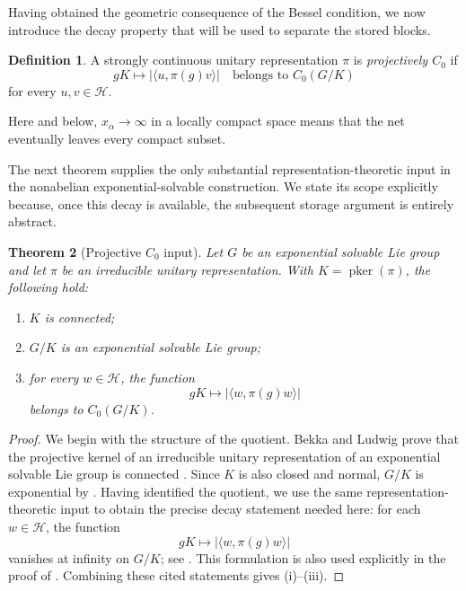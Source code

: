 \documentclass[reqno]{amsart}
\numberwithin{equation}{section}
\newtheorem{theorem}{Theorem}[section]
\theoremstyle{definition}
\newtheorem{definition}[theorem]{Definition}
\theoremstyle{remark}
\newcommand{\cH}{\mathcal H}
\newcommand{\pker}{\operatorname{pker}}
\begin{document}
Having obtained the geometric consequence of the Bessel condition, we now
introduce the decay property that will be used to separate the stored blocks.

\begin{definition}\label{def:projective-c0}
A strongly continuous unitary representation $\pi$ is
\emph{projectively $C_0$} if
\begin{equation}\label{eq:projective-c0-definition}
 gK\longmapsto |\langle u,\pi(g)v\rangle|
 \quad\text{belongs to }C_0(G/K)
\end{equation}
for every $u,v\in\cH$.
\end{definition}

Here and below, $x_\alpha\to\infty$ in a locally compact space means that
the net eventually leaves every compact subset.

The next theorem supplies the only substantial representation-theoretic
input in the nonabelian exponential-solvable construction.  We state its
scope explicitly because, once this decay is available, the subsequent
storage argument is entirely abstract.

\begin{theorem}[Projective $C_0$ input]
\label{thm:projective-c0-input}
Let $G$ be an exponential solvable Lie group and let $\pi$ be an irreducible unitary
representation.  With $K=\pker(\pi)$, the following hold:
\begin{enumerate}[label=\textnormal{(\roman*)}]
\item $K$ is connected;
\item $G/K$ is an exponential solvable Lie group;
\item for every $w\in\cH$, the function
\[
 gK\longmapsto |\langle w,\pi(g)w\rangle|
\]
belongs to $C_0(G/K)$.
\end{enumerate}
\end{theorem}

\begin{proof}
We begin with the structure of the quotient.  Bekka and Ludwig prove that the
projective kernel of an irreducible unitary
representation of an exponential solvable Lie group is connected
\cite[Theorem~2.1]{BekkaLudwig1990}.  Since $K$ is also closed and normal,
$G/K$ is exponential by \cite[Corollary~1.8.5]{ArnalCurrey2020}.  Having
identified the quotient, we use the same representation-theoretic input to
obtain the precise decay statement needed
here: for each $w\in\cH$, the function
\[
 gK\longmapsto |\langle w,\pi(g)w\rangle|
\]
vanishes at infinity on $G/K$; see
\cite[Lemma~2.2.1, p.~520]{BekkaLudwig1990}.  This formulation is also used
explicitly in the proof of \cite[Proposition~2.2]{BeltitaVanVelthoven2024}.
Combining these cited statements gives (i)--(iii).
\end{proof}
\end{document}
